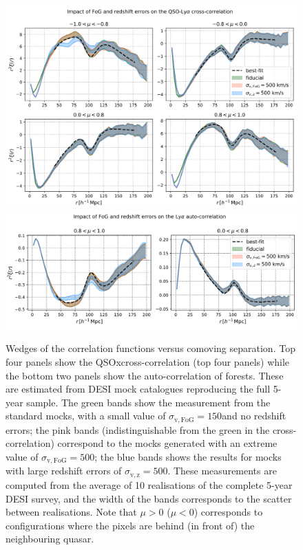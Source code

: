 \begin{figure}
    \centering 
    \includegraphics[width=\textwidth]{fig/forests/zerrors_cross.png}
    \includegraphics[width=\textwidth]{fig/forests/zerrors_auto.png}
    \caption{Wedges of the correlation functions versus comoving separation. 
    Top four panels show the QSOx\lya cross-correlation (top four panels) 
    while the bottom two panels show the \lya auto-correlation of forests. 
    These are estimated from DESI mock catalogues reproducing the full 5-year sample. 
    The green bands show the measurement from the standard mocks, 
    with a small value of $\sigma_\mathrm{v, FoG} = 150$\kms and no redshift errors; 
    the pink bands (indistinguishable from the green in the cross-correlation) 
    correspond to the mocks generated with an extreme value of 
    $\sigma_\mathrm{v, FoG} = 500$\kms; 
    the blue bands shows the results for mocks with large redshift errors of 
    $\sigma_\mathrm{v, z}= 500$\kms. 
    These measurements are computed from the average of 10 realisations of the 
    complete 5-year DESI survey, and the width of the bands corresponds to the 
    scatter between realisations. 
    Note that $\mu > 0$ ($\mu < 0$) corresponds to configurations where 
    the \lya  pixels are behind (in front of) the neighbouring quasar.
    }
    \label{fig:zerrors_correlations}
\end{figure}

